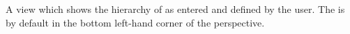 \item[\gdtestcasebrowser]{
A view which shows the hierarchy of \gdcases as entered and defined by the user.
The \gdtestcasebrowser is by default in the bottom left-hand corner
of the perspective. 
}
